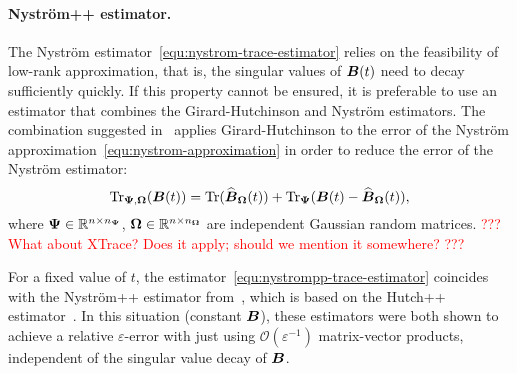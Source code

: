 \paragraph{Nyström++ estimator.}
The Nyström estimator~\eqref{equ:nystrom-trace-estimator} relies on the feasibility of low-rank approximation, that is, the singular values of $\boldsymbol{B}(t)$ need to decay sufficiently quickly.
If this property cannot be ensured, it is preferable to use an estimator that combines the Girard-Hutchinson and Nyström estimators.
The combination suggested in~\cite{lin-2017-randomized-estimation} applies Girard-Hutchinson to the error of the Nyström approximation~\eqref{equ:nystrom-approximation} in order to
reduce the error of the Nyström estimator:
\begin{equation}
    \operatorname{Tr}_{\boldsymbol{\Psi}, \boldsymbol{\Omega}}(\boldsymbol{B}(t)) = \operatorname{Tr}(\widehat{\boldsymbol{B}}_{\boldsymbol{\Omega}}(t)) + \operatorname{Tr}_{\boldsymbol{\Psi}}(\boldsymbol{B}(t) - \widehat{\boldsymbol{B}}_{\boldsymbol{\Omega}}(t)),
    \label{equ:nystrompp-trace-estimator}
\end{equation}
where $\boldsymbol{\Psi} \in \mathbb{R}^{n \times n_{\boldsymbol{\Psi}}}$, $\boldsymbol{\Omega} \in \mathbb{R}^{n \times n_{\boldsymbol{\Omega}}}$ are independent Gaussian random matrices. 
\textcolor{red}{??? What about XTrace? Does it apply; should we mention it somewhere? ???}

For a fixed value of $t$, the estimator~\eqref{equ:nystrompp-trace-estimator} coincides with the Nyström++ estimator from~\cite{persson-2022-improved-variants}, which is based on the Hutch++ estimator~\cite{meyer-2021-hutch-optimal}. In this situation (constant $\boldsymbol{B}$), these estimators were both shown to achieve a relative $\varepsilon$-error with just using $\mathcal{O}(\varepsilon^{-1})$ matrix-vector products, independent of the singular value decay of $\boldsymbol{B}$.

%

